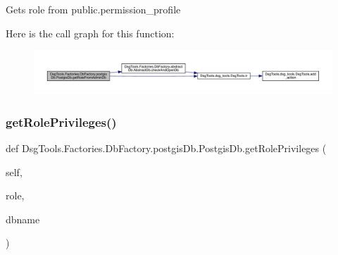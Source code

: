 \begin{DoxyVerb}Gets role from public.permission_profile
\end{DoxyVerb}
 Here is the call graph for this function\+:
\nopagebreak
\begin{figure}[H]
\begin{center}
\leavevmode
\includegraphics[width=350pt]{class_dsg_tools_1_1_factories_1_1_db_factory_1_1postgis_db_1_1_postgis_db_a8dd4d4bac8f4ccb35d3e1a4d089f29e4_cgraph}
\end{center}
\end{figure}
\mbox{\label{class_dsg_tools_1_1_factories_1_1_db_factory_1_1postgis_db_1_1_postgis_db_ab038bb83ac22cc36e91780ad3b5f447d}} 
\subsubsection{\texorpdfstring{get\+Role\+Privileges()}{getRolePrivileges()}}
{\footnotesize\ttfamily def Dsg\+Tools.\+Factories.\+Db\+Factory.\+postgis\+Db.\+Postgis\+Db.\+get\+Role\+Privileges (\begin{DoxyParamCaption}\item[{}]{self,  }\item[{}]{role,  }\item[{}]{dbname }\end{DoxyParamCaption})}

